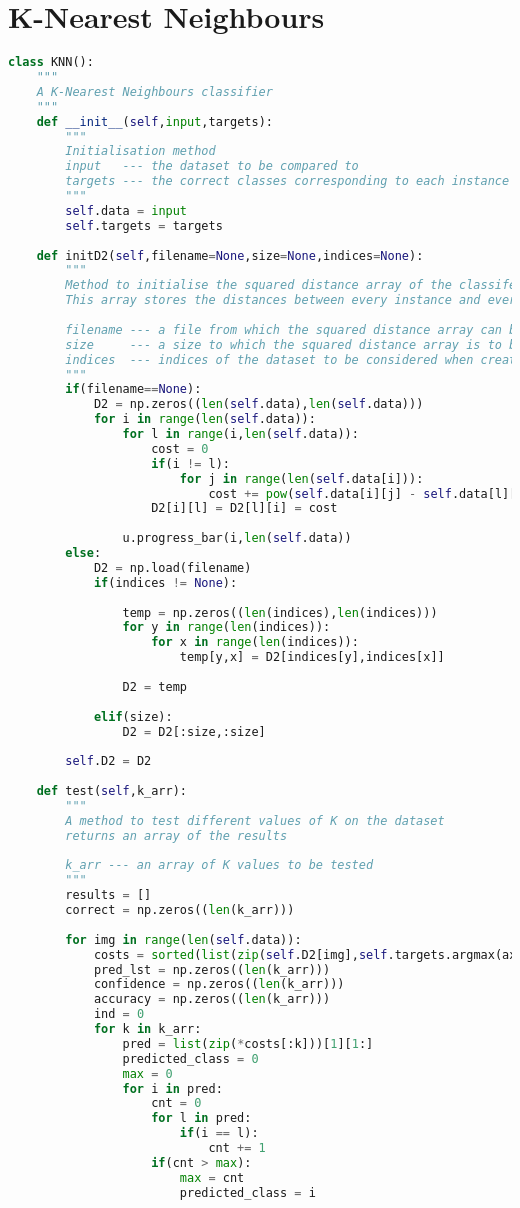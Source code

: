 \chapter{K-Nearest Neighbours}
\begin{lstlisting}[language=Python, caption=K Nearest Neighbours, captionpos=b, label={list:knn}]
class KNN():
	"""
	A K-Nearest Neighbours classifier
	"""
	def __init__(self,input,targets):
		""" 
		Initialisation method
		input   --- the dataset to be compared to
		targets --- the correct classes corresponding to each instance in the dataset
		"""
		self.data = input
		self.targets = targets
	
	def initD2(self,filename=None,size=None,indices=None):
		"""
		Method to initialise the squared distance array of the classifer
		This array stores the distances between every instance and every other instance
		
		filename --- a file from which the squared distance array can be imported (default: None)
		size     --- a size to which the squared distance array is to be cropped  (default: None)
		indices  --- indices of the dataset to be considered when creating the squared distance array (default: None)
		"""
		if(filename==None):
			D2 = np.zeros((len(self.data),len(self.data)))
			for i in range(len(self.data)):
				for l in range(i,len(self.data)):
					cost = 0
					if(i != l):
						for j in range(len(self.data[i])):
							cost += pow(self.data[i][j] - self.data[l][j],2)
					D2[i][l] = D2[l][i] = cost      
		
				u.progress_bar(i,len(self.data))    
		else:
			D2 = np.load(filename)
			if(indices != None):
		
				temp = np.zeros((len(indices),len(indices)))
				for y in range(len(indices)):
					for x in range(len(indices)):
						temp[y,x] = D2[indices[y],indices[x]]
		
				D2 = temp
		
			elif(size):
				D2 = D2[:size,:size]
		
		self.D2 = D2
	
	def test(self,k_arr):
		"""
		A method to test different values of K on the dataset
		returns an array of the results
		
		k_arr --- an array of K values to be tested
		"""
		results = []
		correct = np.zeros((len(k_arr))) 
		
		for img in range(len(self.data)):
			costs = sorted(list(zip(self.D2[img],self.targets.argmax(axis=1))))
			pred_lst = np.zeros((len(k_arr)))
			confidence = np.zeros((len(k_arr)))
			accuracy = np.zeros((len(k_arr)))
			ind = 0
			for k in k_arr:
				pred = list(zip(*costs[:k]))[1][1:]
				predicted_class = 0
				max = 0 
				for i in pred: 
					cnt = 0
					for l in pred:
						if(i == l):
							cnt += 1
					if(cnt > max):
						max = cnt
						predicted_class = i
		

\end{lstlisting}
